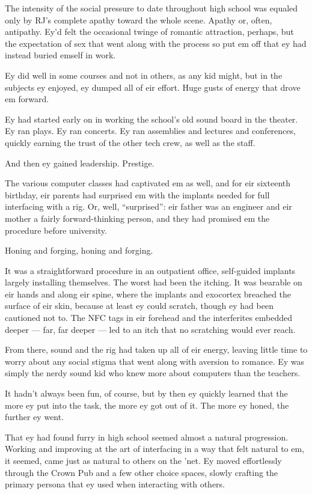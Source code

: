 The intensity of the social pressure to date throughout high school was equaled only by RJ's complete apathy toward the whole scene. Apathy or, often, antipathy. Ey'd felt the occasional twinge of romantic attraction, perhaps, but the expectation of sex that went along with the process so put em off that ey had instead buried emself in work.

Ey did well in some courses and not in others, as any kid might, but in the subjects ey enjoyed, ey dumped all of eir effort. Huge gusts of energy that drove em forward.

Ey had started early on in working the school's old sound board in the theater. Ey ran plays. Ey ran concerts. Ey ran assemblies and lectures and conferences, quickly earning the trust of the other tech crew, as well as the staff.

And then ey gained leadership. Prestige.

The various computer classes had captivated em as well, and for eir sixteenth birthday, eir parents had surprised em with the implants needed for full interfacing with a rig. Or, well, ``surprised'': eir father was an engineer and eir mother a fairly forward-thinking person, and they had promised em the procedure before university.

Honing and forging, honing and forging.

It was a straightforward procedure in an outpatient office, self-guided implants largely installing themselves. The worst had been the itching. It was bearable on eir hands and along eir spine, where the implants and exocortex breached the surface of eir skin, because at least ey could scratch, though ey had been cautioned not to. The NFC tags in eir forehead and the interferites embedded deeper — far, far deeper — led to an itch that no scratching would ever reach.

From there, sound and the rig had taken up all of eir energy, leaving little time to worry about any social stigma that went along with aversion to romance. Ey was simply the nerdy sound kid who knew more about computers than the teachers.

It hadn't always been fun, of course, but by then ey quickly learned that the more ey put into the task, the more ey got out of it. The more ey honed, the further ey went.

That ey had found furry in high school seemed almost a natural progression. Working and improving at the art of interfacing in a way that felt natural to em, it seemed, came just as natural to others on the 'net. Ey moved effortlessly through the Crown Pub and a few other choice spaces, slowly crafting the primary persona that ey used when interacting with others.

